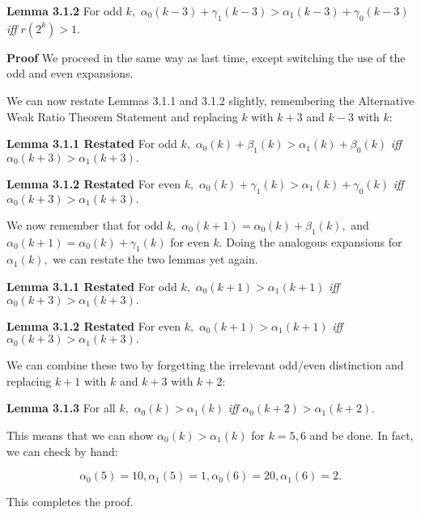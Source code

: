 \documentclass{article}
\begin{document}
\textbf{Lemma 3.1.2} For odd $k,$ $\alpha_0(k-3) + \gamma_1(k-3) > \alpha_1(k-3) + \gamma_0(k-3)$ \emph{iff} $r(2^k) > 1.$

\textbf{Proof} We proceed in the same way as last time, except switching the use of the odd and even expansions.

We can now restate Lemmas 3.1.1 and 3.1.2 slightly, remembering the Alternative Weak Ratio Theorem Statement and replacing $k$ with $k+3$ and $k-3$ with $k:$

\textbf{Lemma 3.1.1 Restated} For odd $k,$ $\alpha_0(k) + \beta_1(k) > \alpha_1(k) + \beta_0(k)$ \emph{iff} $\alpha_0(k+3) > \alpha_1(k+3).$

\textbf{Lemma 3.1.2 Restated} For even $k,$ $\alpha_0(k) + \gamma_1(k) > \alpha_1(k) + \gamma_0(k)$ \emph{iff} $\alpha_0(k+3) > \alpha_1(k+3).$

We now remember that for odd $k,$ $\alpha_0(k+1) = \alpha_0(k) + \beta_1(k),$ and $\alpha_0(k+1) = \alpha_0(k) + \gamma_1(k)$ for even $k.$ Doing the analogous expansions for $\alpha_1(k),$ we can restate the two lemmas yet again.

\textbf{Lemma 3.1.1 Restated} For odd $k,$ $\alpha_0(k+1) > \alpha_1(k+1)$ \emph{iff} $\alpha_0(k+3) > \alpha_1(k+3).$

\textbf{Lemma 3.1.2 Restated} For even $k,$ $\alpha_0(k+1) > \alpha_1(k+1)$ \emph{iff} $\alpha_0(k+3) > \alpha_1(k+3).$

We can combine these two by forgetting the irrelevant odd/even distinction and replacing $k+1$ with $k$ and $k+3$ with $k+2:$

\textbf{Lemma 3.1.3} For all $k,$ $\alpha_0(k) > \alpha_1(k)$ \emph{iff} $\alpha_0(k+2) > \alpha_1(k+2).$

This means that we can show $\alpha_0(k) > \alpha_1(k)$ for $k = 5, 6$ and be done. In fact, we can check by hand:

$$\alpha_0(5) = 10, \alpha_1(5) = 1, \alpha_0(6) = 20, \alpha_1(6) = 2.$$

This completes the proof.
\end{document}
